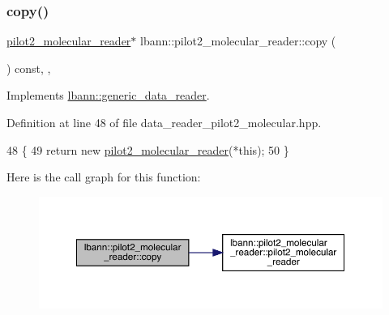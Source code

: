 \subsubsection{\texorpdfstring{copy()}{copy()}}
{\footnotesize\ttfamily \hyperlink{classlbann_1_1pilot2__molecular__reader}{pilot2\+\_\+molecular\+\_\+reader}$\ast$ lbann\+::pilot2\+\_\+molecular\+\_\+reader\+::copy (\begin{DoxyParamCaption}{ }\end{DoxyParamCaption}) const\hspace{0.3cm}{\ttfamily [inline]}, {\ttfamily [override]}, {\ttfamily [virtual]}}



Implements \hyperlink{classlbann_1_1generic__data__reader_a208ba1223e7aaa75e94b728501f12f86}{lbann\+::generic\+\_\+data\+\_\+reader}.



Definition at line 48 of file data\+\_\+reader\+\_\+pilot2\+\_\+molecular.\+hpp.


\begin{DoxyCode}
48                                                  \{
49     \textcolor{keywordflow}{return} \textcolor{keyword}{new} \hyperlink{classlbann_1_1pilot2__molecular__reader_ac883c7e0fcc935bc6573efa3352275ca}{pilot2\_molecular\_reader}(*\textcolor{keyword}{this});
50   \}
\end{DoxyCode}
Here is the call graph for this function\+:\nopagebreak
\begin{figure}[H]
\begin{center}
\leavevmode
\includegraphics[width=350pt]{classlbann_1_1pilot2__molecular__reader_a6582f4c77b62df27aa603dc58a4f4512_cgraph}
\end{center}
\end{figure}
\mbox{\label{classlbann_1_1pilot2__molecular__reader_a9ad317abcd6f5de777d536f7796a3b12}} 

